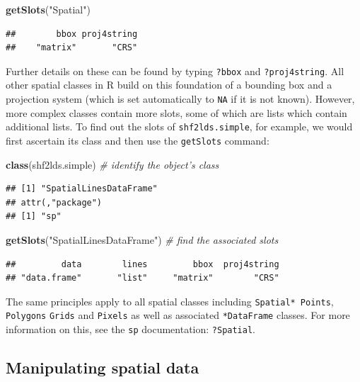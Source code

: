 \documentclass[]{article}
\newenvironment{Shaded}{}{}
\newcommand{\KeywordTok}[1]{\textcolor[rgb]{0.00,0.44,0.13}{\textbf{{#1}}}}
\newcommand{\StringTok}[1]{\textcolor[rgb]{0.25,0.44,0.63}{{#1}}}
\newcommand{\CommentTok}[1]{\textcolor[rgb]{0.38,0.63,0.69}{\textit{{#1}}}}
\newcommand{\NormalTok}[1]{{#1}}
\begin{document}
\begin{Shaded}
\begin{Highlighting}[]
\KeywordTok{getSlots}\NormalTok{(}\StringTok{"Spatial"}\NormalTok{)}
\end{Highlighting}
\end{Shaded}
\begin{verbatim}
##        bbox proj4string 
##    "matrix"       "CRS"
\end{verbatim}
Further details on these can be found by typing \texttt{?bbox} and
\texttt{?proj4string}. All other spatial classes in R build on this
foundation of a bounding box and a projection system (which is set
automatically to \texttt{NA} if it is not known). However, more complex
classes contain more slots, some of which are lists which contain
additional lists. To find out the slots of \texttt{shf2lds.simple}, for
example, we would first ascertain its class and then use the
\texttt{getSlots} command:

\begin{Shaded}
\begin{Highlighting}[]
\KeywordTok{class}\NormalTok{(shf2lds.simple)  }\CommentTok{# identify the object's class}
\end{Highlighting}
\end{Shaded}
\begin{verbatim}
## [1] "SpatialLinesDataFrame"
## attr(,"package")
## [1] "sp"
\end{verbatim}
\begin{Shaded}
\begin{Highlighting}[]
\KeywordTok{getSlots}\NormalTok{(}\StringTok{"SpatialLinesDataFrame"}\NormalTok{)  }\CommentTok{# find the associated slots}
\end{Highlighting}
\end{Shaded}
\begin{verbatim}
##         data        lines         bbox  proj4string 
## "data.frame"       "list"     "matrix"        "CRS"
\end{verbatim}
The same principles apply to all spatial classes including
\texttt{Spatial* Points}, \texttt{Polygons} \texttt{Grids} and
\texttt{Pixels} as well as associated \texttt{*DataFrame} classes. For
more information on this, see the \texttt{sp} documentation:
\texttt{?Spatial}.

\subsection{Manipulating spatial data}
\end{document}
